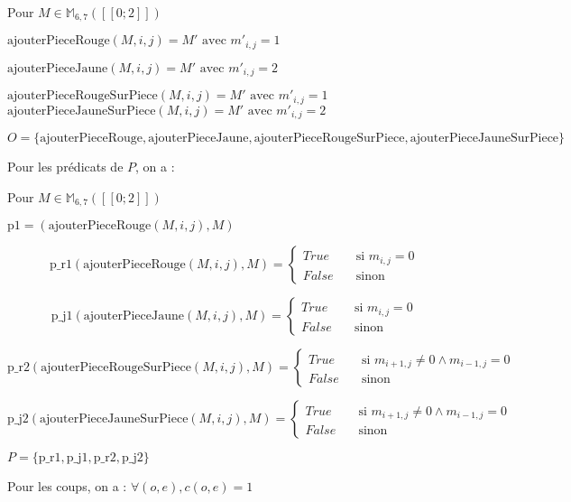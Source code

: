 \documentclass{article}
\begin{document}
Pour $M \in \mathbb{M}_{6, 7}([\![0;2]\!])$

$\text{ajouterPieceRouge}(M, i, j) = M'\text{ avec }m'_{i, j} = 1$

$\text{ajouterPieceJaune}(M, i, j) = M'\text{ avec }m'_{i, j} = 2$

$\text{ajouterPieceRougeSurPiece}(M, i, j) = M'\text{ avec }m'_{i, j} = 1$
$\text{ajouterPieceJauneSurPiece}(M, i, j) = M'\text{ avec }m'_{i, j} = 2$







$O = \{ \text{ajouterPieceRouge}, \text{ajouterPieceJaune}, \text{ajouterPieceRougeSurPiece}, \text{ajouterPieceJauneSurPiece} \}$


Pour les prédicats de $P$, on a :

Pour $M \in \mathbb{M}_{6, 7}([\![0;2]\!])$


$\text{p1} = (\text{ajouterPieceRouge}(M, i, j), M) $

\[ \text{p\_r1}(\text{ajouterPieceRouge}(M, i, j), M) =
  \begin{cases}
    True       & \quad \text{si } m_{i, j} =0\\
    False      & \quad \text{sinon}
  \end{cases}
\]
 
\[ \text{p\_j1}(\text{ajouterPieceJaune}(M, i, j), M) =
  \begin{cases}
    True       & \quad \text{si } m_{i, j} =0\\
    False      & \quad \text{sinon}
  \end{cases}
\]




\[ \text{p\_r2}(\text{ajouterPieceRougeSurPiece}(M, i, j), M) =
  \begin{cases}
    True       & \quad \text{si } m_{i+1, j} \neq 0 \wedge m_{i-1, j} = 0 \\
    False      & \quad \text{sinon}
  \end{cases}
\]

\[ \text{p\_j2}(\text{ajouterPieceJauneSurPiece}(M, i, j), M) =
  \begin{cases}
    True       & \quad \text{si } m_{i+1, j} \neq 0 \wedge m_{i-1, j} = 0 \\
    False      & \quad \text{sinon}
  \end{cases}
\]

 

$P = \{\text{p\_r1}, \text{p\_j1}, \text{p\_r2}, \text{p\_j2} \}$


Pour les coups, on a : $\forall(o,e), c(o,e) = 1$
\end{document}
